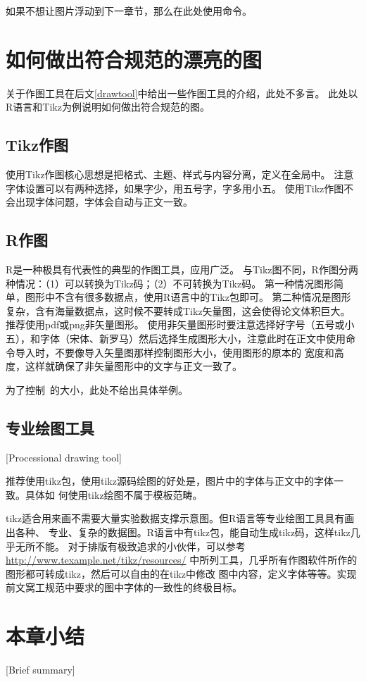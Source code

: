 \clearpage

如果不想让图片浮动到下一章节，那么在此处使用命令。


\section{如何做出符合规范的漂亮的图}

关于作图工具在后文\ref{drawtool}中给出一些作图工具的介绍，此处不多言。
此处以R语言和Tikz为例说明如何做出符合规范的图。

\subsection{Tikz作图}

使用Tikz作图核心思想是把格式、主题、样式与内容分离，定义在全局中。
注意字体设置可以有两种选择，如果字少，用五号字，字多用小五。
使用Tikz作图不会出现字体问题，字体会自动与正文一致。

\subsection{R作图}

R是一种极具有代表性的典型的作图工具，应用广泛。
与Tikz图不同，R作图分两种情况：（1）可以转换为Tikz码；（2）不可转换为Tikz码。
第一种情况图形简单，图形中不含有很多数据点，使用R语言中的Tikz包即可。
第二种情况是图形复杂，含有海量数据点，这时候不要转成Tikz矢量图，这会使得论文体积巨大。
推荐使用pdf或png非矢量图形。
使用非矢量图形时要注意选择好字号（五号或小五），和字体（宋体、新罗马）然后选择生成图形大小，注意此时在正文中使用命令导入时，不要像导入矢量图那样控制图形大小，使用图形的原本的
宽度和高度，这样就确保了非矢量图形中的文字与正文一致了。

为了控制\hitszthesis\ 的大小，此处不给出具体举例。

\subsection{专业绘图工具}[Processional drawing tool]
\label{drawtool}

推荐使用tikz包，使用tikz源码绘图的好处是，图片中的字体与正文中的字体一致。具体如
何使用tikz绘图不属于模板范畴。

tikz适合用来画不需要大量实验数据支撑示意图。但R语言等专业绘图工具具有画出各种、
专业、复杂的数据图。R语言中有tikz包，能自动生成tikz码，这样tikz几乎无所不能。
对于排版有极致追求的小伙伴，可以参考
\href{http://www.texample.net/tikz/resources/}{http://www.texample.net/tikz/resources/}
中所列工具，几乎所有作图软件所作的图形都可转成tikz，然后可以自由的在tikz中修改
图中内容，定义字体等等。实现前文窝工规范中要求的图中字体的一致性的终极目标。

\lipsum[1]

\section{本章小结}[Brief summary]

\lipsum[1]
